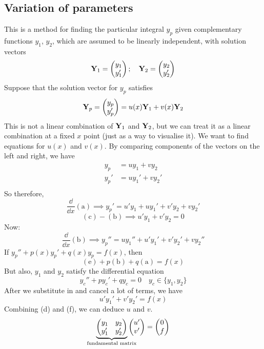 \subsection{Variation of parameters}
This is a method for finding the particular integral \(y_p\) given complementary functions \(y_1\), \(y_2\), which are assumed to be linearly independent, with solution vectors
\[
	\vb Y_1 = \begin{pmatrix}
		y_1 \\ y_1'
	\end{pmatrix};\quad \vb Y_2 = \begin{pmatrix}
		y_2 \\ y_2'
	\end{pmatrix}
\]
Suppose that the solution vector for \(y_p\) satisfies
\begin{equation}\label{varparam1}
	\vb Y_p = \begin{pmatrix}
		y_p \\ y_p'
	\end{pmatrix} = u(x)\vb Y_1 + v(x)\vb Y_2
\end{equation}
This is not a linear combination of \(\vb Y_1\) and \(\vb Y_2\), but we can treat it as a linear combination at a fixed \(x\) point (just as a way to visualise it).
We want to find equations for \(u(x)\) and \(v(x)\).
By comparing components of the vectors on the left and right, we have
\begin{align*}
	y_p  & = uy_1 + vy_2 \tag{a}   \\
	y_p' & = uy_1' + vy_2' \tag{b} \\
\end{align*}
So therefore,
\[
	\frac{\dd}{\dd{x}}(\mathrm a) \implies y_p' = u'y_1 + uy_1' + v'y_2 + vy_2' \tag{c}
\]
\[
	(\mathrm c) - (\mathrm b) \implies u'y_1 + v'y_2 = 0 \tag{d}
\]
Now:
\[
	\frac{\dd}{\dd{x}}(\mathrm b) \implies y_p'' = uy_1'' + u'y_1' + v'y_2' + vy_2'' \tag{e}
\]
If \(y_p'' + p(x)y_p' + q(x)y_p = f(x)\), then
\[
	(\mathrm e) + p(\mathrm b) + q(\mathrm a) = f(x)
\]
But also, \(y_1\) and \(y_2\) satisfy the differential equation
\[
	y_c'' + py_c' + qy_c = 0\quad y_c \in \{ y_1, y_2 \}
\]
After we substitute in and cancel a lot of terms, we have
\[
	u'y_1' + v'y_2' = f(x) \tag{f}
\]
Combining (d) and (f), we can deduce \(u\) and \(v\).
\[
	\underbrace{\begin{pmatrix}
			y_1 & y_2 \\ y_1' & y_2'
		\end{pmatrix}}_{\mathclap{\text{fundamental matrix}}} \begin{pmatrix}
		u' \\ v'
	\end{pmatrix} = \begin{pmatrix}
		0 \\ f
	\end{pmatrix}
\]
